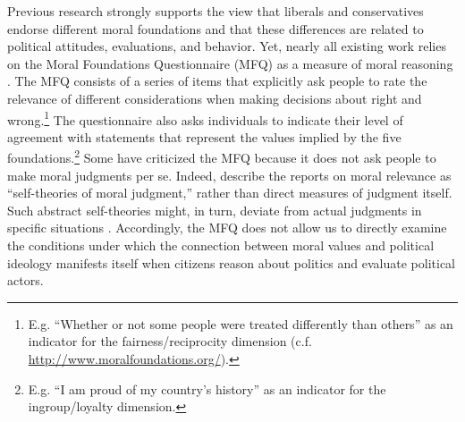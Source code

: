 \documentclass[12pt]{article}
\begin{document}
Previous research strongly supports the view that liberals and conservatives endorse different moral foundations and that these differences are related to political attitudes, evaluations, and behavior. Yet, nearly all existing work relies on the Moral Foundations Questionnaire (MFQ) as a measure of moral reasoning \citep[but see][]{clifford2014linking}. The MFQ consists of a series of items that explicitly ask people to rate the relevance of different considerations when making decisions about right and wrong.\footnote{E.g. ``Whether or not some people were treated differently than others'' as an indicator for the fairness/reciprocity dimension (c.f. \url{http://www.moralfoundations.org/}).} The questionnaire also asks individuals to indicate their level of agreement with statements that represent the values implied by the five foundations.\footnote{E.g. ``I am proud of my country’s history'' as an indicator for the ingroup/loyalty dimension.} Some have criticized the MFQ because it does not ask people to make moral judgments per se. Indeed, \citet[1031]{graham2009liberals} describe the reports on moral relevance as ``self-theories of moral judgment,'' rather than direct measures of judgment itself. Such abstract self-theories might, in turn, deviate from actual judgments in specific situations \citep[see][for an alternative way to measure moral judgment]{clifford2015moral}. Accordingly, the MFQ does not allow us to directly examine the conditions under which the connection between moral values and political ideology manifests itself when citizens reason about politics and evaluate political actors.
\end{document}
